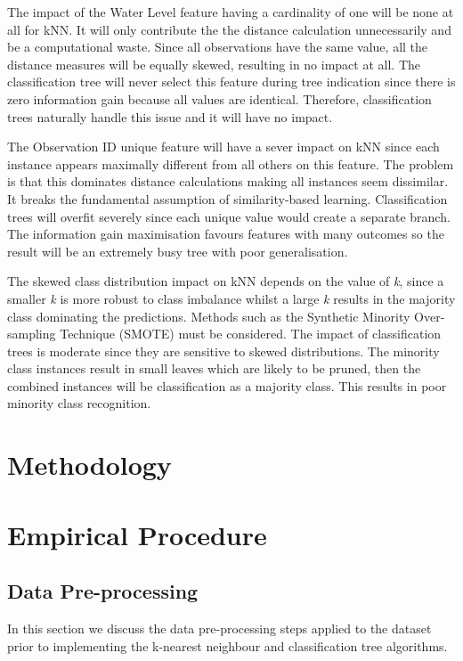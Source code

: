 \documentclass[conference]{IEEEtran}
\begin{document}
The impact of the Water Level feature having a cardinality of one will be none at all for kNN. It will only contribute the the distance calculation unnecessarily and be a computational waste. Since all observations have the same value, all the distance measures will be equally skewed, resulting in no impact at all. The classification tree will never select this feature during tree indication since there is zero information gain because all values are identical. Therefore, classification trees naturally handle this issue and it will have no impact.

The Observation ID unique feature will have a sever impact on kNN since each instance appears maximally different from all others on this feature. The problem is that this dominates distance calculations making all instances seem dissimilar. It breaks the fundamental assumption of similarity-based learning. Classification trees will overfit severely since each unique value would create a separate branch. The information gain maximisation favours features with many outcomes so the result will be an extremely busy tree with poor generalisation.

The skewed class distribution impact on kNN depends on the value of \textit{k}, since a smaller \textit{k} is more robust to class imbalance whilst a large \textit{k} results in the majority class dominating the predictions. Methods such as the Synthetic Minority Over-sampling Technique (SMOTE) must be considered. The impact of classification trees is moderate since they are sensitive to skewed distributions. The minority class instances result in small leaves which are likely to be pruned, then the combined instances will be classification as a majority class. This results in poor minority class recognition.

\section{Methodology}
\section{Empirical Procedure}

\subsection{Data Pre-processing}
In this section we discuss the data pre-processing steps applied to the dataset prior to implementing the k-nearest neighbour and classification tree algorithms.
\end{document}
